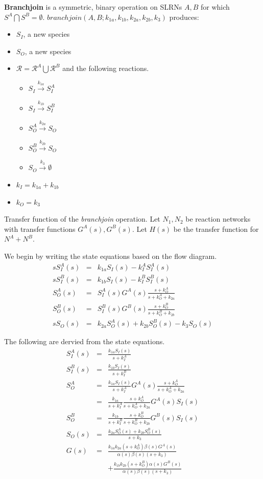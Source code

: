 \documentclass[unnumsec,webpdf,contemporary,large]{oup-authoring-template}%
\theoremstyle{thmstyleone}%
\theoremstyle{thmstyletwo}%
\theoremstyle{thmstylethree}%
\begin{document}
{\bf Branchjoin} is a symmetric, binary operation on SLRNs $A, B$ for which
$S^A \bigcap S^B = \emptyset$.
$branchjoin(A, B; k_{1a}, k_{1b}, k_{2a}, k_{2b}, k_3)$
produces:
\begin{itemize}
\item $S_I$, a new species
\item $S_O$, a new species
\item $\mathcal{R} = \mathcal{R}^A \bigcup \mathcal{R}^B$ and the following reactions.
\begin{itemize}
\item
$S_I \xrightarrow{k_{1a}} S^A_I$
\item $S_I \xrightarrow{k_{1b}} S^B_I$
\item
$S^A_O \xrightarrow{k_{2a}} S_O$
\item
$S^B_O \xrightarrow{k_{2b}} S_O$
\item
$S_O \xrightarrow{k_3} \emptyset$
\end{itemize}
\item $k_I = k_{1a} + k_{1b}$
\item $k_O = k_3$
\end{itemize}

Transfer function of the {\em branchjoin} operation.
Let $N_1, N_2$ be reaction networks with transfer functions $G^A(s), G^B(s)$. Let $H(s)$ be the transfer function for $N^A + N^B$.

We begin by writing the state equations based on the flow diagram.
   \begin{eqnarray}
   s S^A_I (s) & = & k_{1a} S_I(s) - k^A_I S^A_I (s) \nonumber \\
   s S^B_I (s) & = & k_{1b} S_I(s) - k^B_I S^B_I (s) \nonumber \\
   S^A_O (s) & = &  S^A_I (s) G^A(s) \frac{s + k^A_O}{s + k^A_O + k_{2a}} \nonumber \\
   S^B_O (s) & = & S^B_I (s)  G^B(s) \frac{s + k^B_O}{s + k^B_O + k_{2b}} \nonumber \\
   sS_O (s) & = & k_{2a} S^A_O(s) + k_{2b} S^B_O(s) - k_3 S_O(s)
   \end{eqnarray}

The following are dervied from the state equations.
\begin{eqnarray}
S^A_I(s) & = & \frac{k_{1a} S_I (s)}{s + k^A_I} \nonumber \\
S^B_I(s) & = & \frac{k_{1b} S_I (s)}{s + k^B_I} \nonumber \\
S^A_O & = & \frac{k_{1a} S_I (s)}{s + k^A_I} G^A(s) \frac{s + k^A_O}{s + k^A_O + k_{2a}} \nonumber\\
   & = & \frac{k_{1a}}{s + k^A_I} \frac{s + k^A_O}{s + k^A_O + k_{2a}}  G^A(s) S_I (s) \nonumber \\
S^B_O
   & = & \frac{k_{1b}}{s + k^B_I} \frac{s + k^B_O}{s + k^B_O + k_{2b}}  G^B(s) S_I (s) \nonumber \\
S_O (s) & = & \frac{k_{2a} S^A_O(s) + k_{2b} S^B_O(s) }{s + k_3} \nonumber \\
G(s) & = & \frac{k_{1a} k_{2a} (s + k^A_O) \beta(s) G^A(s) }{\alpha(s) \beta(s) (s + k_3)} \nonumber \\
& & +  \frac{k_{1b}  k_{2b} (s + k^B_O)\alpha(s) G^B(s) }{\alpha(s) \beta(s) (s + k_3)} 
\end{eqnarray}
\end{document}
